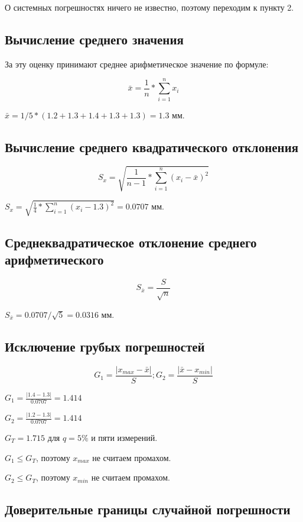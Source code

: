 \documentclass[12pt, a4paper]{article}
\begin{document}
О системных погрешностях ничего не известно, поэтому переходим к пункту 2.

\subsection*{Вычисление среднего значения}

За эту оценку принимают среднее арифметическое значение  по формуле:

$$\bar{x} = \frac{1}{n} * \sum_{i = 1}^{n} x_i$$

$\bar{x} = 1/5 * (1.2 + 1.3 + 1.4 + 1.3 + 1.3) = 1.3$ мм.

\subsection*{Вычисление среднего квадратического отклонения}

$$S_x = \sqrt{\frac{1}{n-1} * \sum_{i = 1}^{n} (x_i - \bar{x})^2}$$

$S_x = \sqrt{\frac{1}{4} * \sum_{i = 1}^{n} (x_i - 1.3)^2} = 0.0707$ мм.

\subsection*{Среднеквадратическое отклонение среднего арифметического}

$$S_{\bar{x}} = \frac{S}{\sqrt{n}}$$

$S_{\bar{x}} = 0.0707 / \sqrt{5} = 0.0316$ мм.

\subsection*{Исключение грубых погрешностей}

$$G_1 = \frac{|x_{max} - \bar{x}|}{S}; G_2 = \frac{|\bar{x} - x_{min}|}{S}$$

$G_1 = \frac{|1.4 - 1.3|}{0.0707} = 1.414$

$G_2 = \frac{|1.2 - 1.3|}{0.0707} = 1.414$

$G_T = 1.715$ для $q = 5\%$ и пяти измерений.

$G_1 \leq G_T$, поэтому $x_{max}$ не считаем промахом.

$G_2 \leq G_T$, поэтому $x_{min}$ не считаем промахом.

\subsection*{Доверительные границы случайной погрешности}
\end{document}
